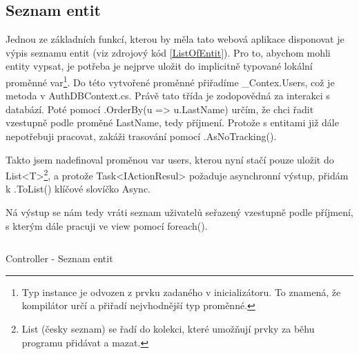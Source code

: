 \documentclass[a4paper, 12pt]{report}
\begin{document}
	\subsection{Seznam entit} \label{Seznam_entit}
	Jednou ze základních funkcí, kterou by měla tato webová aplikace disponovat je výpis seznamu entit (viz zdrojový kód \ref{ListOfEntit}). Pro to, abychom mohli entity vypsat, je potřeba je nejprve uložit do implicitně typované lokální proměnné var\footnote{Typ instance je odvozen z prvku zadaného v inicializátoru. To znamená, že kompilátor určí a přiřadí nejvhodnější typ proměnné.}. Do této vytvořené proměnné přiřadíme \_Contex.Users, což je metoda v AuthDBContext.cs. Právě tato třída je zodopovědná za interakci s databází. Poté pomocí .OrderBy(u => u.LastName) určím, že chci řadit vzestupně podle proměné LastName, tedy příjmení. Protože s entitami již dále nepotřebuji pracovat, zakáži trasování pomocí .AsNoTracking().\par
	Takto jsem nadefinoval proměnou var users, kterou nyní stačí pouze uložit do List<T>\footnote{List (česky seznam) se řadí do kolekci, které umožňují prvky za běhu programu přidávat a mazat.}, a protože Task<IActionResul> požaduje asynchronní výstup, přidám k .ToList() klíčové slovíčko Async.\par
	Ná výstup se nám tedy vráti seznam uživatelů seřazený vzestupně podle příjmení, s kterým dále pracuji ve view pomocí foreach().
	\begin{listing}[H]
		\inputminted{csharp}{SourceCode/Controllers/ListOfEntit.cs}
		\caption{Controller - Seznam entit}
		\label{ListOfEntit}
	\end{listing}
\end{document}
